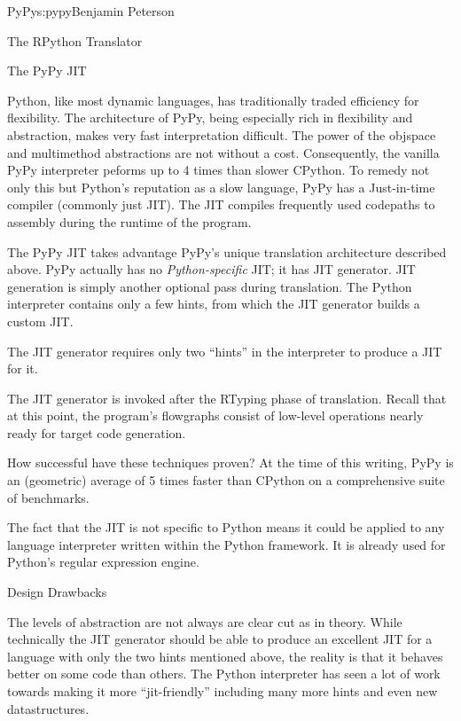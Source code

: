\begin{aosachapter}{PyPy}{s:pypy}{Benjamin Peterson}
\begin{aosasect1}{The RPython Translator}
\end{aosasect1}

\begin{aosasect1}{The PyPy JIT}

Python, like most dynamic languages, has traditionally traded efficiency for
flexibility. The architecture of PyPy, being especially rich in flexibility and
abstraction, makes very fast interpretation difficult. The power of the objspace
and multimethod abstractions are not without a cost. Consequently, the vanilla
PyPy interpreter peforms up to 4 times than slower CPython. To remedy not only
this but Python's reputation as a slow language, PyPy has a Just-in-time
compiler (commonly just JIT). The JIT compiles frequently used codepaths to
assembly during the runtime of the program.

The PyPy JIT takes advantage PyPy's unique translation architecture described
above. PyPy actually has no \emph{Python-specific} JIT; it has JIT
generator. JIT generation is simply another optional pass during
translation. The Python interpreter contains only a few hints, from which the
JIT generator builds a custom JIT.

The JIT generator requires only two ``hints'' in the interpreter to produce a
JIT for it.

The JIT generator is invoked after the RTyping phase of translation. Recall that
at this point, the program's flowgraphs consist of low-level operations nearly
ready for target code generation.

How successful have these techniques proven? At the time of this writing, PyPy
is an (geometric) average of 5 times faster than CPython on a comprehensive
suite of benchmarks.

The fact that the JIT is not specific to Python means it could be applied to any
language interpreter written within the Python framework. It is already used
for Python's regular expression engine.

\end{aosasect1}

\begin{aosasect1}{Design Drawbacks}
\label{sec:drawbacks}

The levels of abstraction are not always are clear cut as in theory. While
technically the JIT generator should be able to produce an excellent JIT for a
language with only the two hints mentioned above, the reality is that it behaves
better on some code than others. The Python interpreter has seen a lot of work
towards making it more ``jit-friendly'' including many more hints and even new
datastructures.


\end{aosasect1}
\end{aosachapter}
